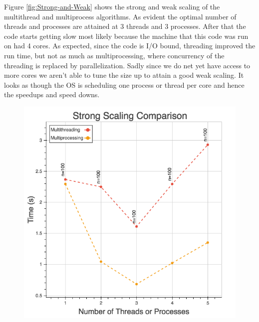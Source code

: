 \documentclass[10pt,twocolumn,letterpaper]{article}
\begin{document}
Figure \ref{fig:Strong-and-Weak} shows the strong and weak scaling
of the multithread and multiprocess algorithms. As evident the optimal
number of threads and processes are attained at 3 threads and 3 processes.
After that the code starts getting slow most likely because the machine
that this code was run on had 4 cores. As expected, since the code
is I/O bound, threading improved the run time, but not as much as
multiprocessing, where concurrency of the threading is replaced by
parallelization. Sadly since we do net yet have access to more cores
we aren't able to tune the size up to attain a good weak scaling.
It looks as though the OS is scheduling one process or thread per
core and hence the speedups and speed downs.

\begin{figure}[htbp] 
\begin{center}
\includegraphics[scale=0.35]{figure/mt_mp_ss_comp.png} \\

\end{center}
\end{figure}
\end{document}
